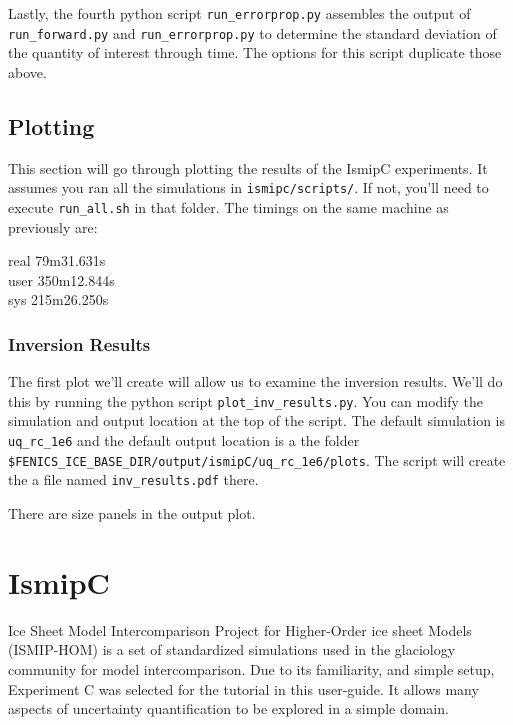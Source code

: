 \documentclass[11pt, reqno, nocenter]{article}
\begin{document}
Lastly, the fourth python script {\tt run\_errorprop.py} assembles the output of {\tt run\_forward.py} and {\tt run\_errorprop.py} to determine the standard deviation of the quantity of interest through time. The options for this script duplicate those above.

\subsection{Plotting}

This section will go through plotting the results of the IsmipC experiments. It assumes you ran all the simulations in {\tt ismipc/scripts/}. If not, you'll need to execute {\tt run\_all.sh} in that folder. The timings on the same machine as previously are:

real    \hspace{10mm}79m31.631s         \\                                                                                            
user   \hspace{8mm} 350m12.844s      \\                                                                                               
sys     \hspace{11mm}215m26.250s    \\

\subsubsection{Inversion Results}
The first plot we'll create will allow us to examine the inversion results. We'll do this by running the python script {\tt plot\_inv\_results.py}. You can modify the simulation and output location at the top of the script. The default simulation is {\tt uq\_rc\_1e6} and the default output location is a the folder {\tt \$FENICS\_ICE\_BASE\_DIR/output/ismipC/uq\_rc\_1e6/plots}. The script will create the a file named {\tt inv\_results.pdf} there.


There are size panels in the output plot.




\section{IsmipC}\label{IsmipC}
Ice Sheet Model Intercomparison Project for Higher-Order ice sheet Models (ISMIP-HOM) is a set of standardized simulations used in the glaciology community for model intercomparison. Due to its familiarity, and simple setup, Experiment C was selected for the tutorial in this user-guide. It allows many aspects of uncertainty quantification to be explored in a simple domain.
\end{document}
